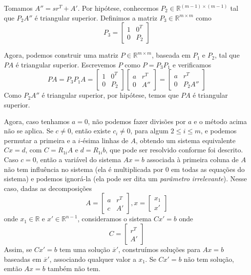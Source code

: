 \documentclass[]{article}
\numberwithin{equation}{section}
\begin{document}
Tomamos $A'' = sr^T + A'$. Por hipótese, conhecemos $P_2 \in \mathbb{R}^{(m - 1) \times (m - 1)}$ tal que $P_2 A''$ é triangular superior. Definimos a matriz $P_3 \in \mathbb{R}^{m \times m}$ como
$$
P_3 =
\begin{bmatrix}
1 & 0^T \\
0 & P_2
\end{bmatrix}
$$

Agora, podemos construir uma matriz $P \in \mathbb{R}^{m \times m}$, baseada em $P_1$ e $P_2$, tal que $PA$ é triangular superior. Escrevemos $P$ como $P = P_3 P_1$ e verificamos
$$
PA = P_3 P_1 A =
\begin{bmatrix}
1 & 0^T \\
0 & P_2
\end{bmatrix}
\begin{bmatrix}
a & r^T \\
0 & A''
\end{bmatrix}
=
\begin{bmatrix}
a & r^T \\
0 & P_2 A''
\end{bmatrix}
$$
Como $P_2 A''$ é triangular superior, por hipótese, temos que $PA$ é triangular superior.

Agora, caso tenhamos $a = 0$, não podemos fazer divisões por $a$ e o método acima não se aplica. Se $c \neq 0$, então existe $c_i \neq 0$, para algum $2 \leq i \leq m$, e podemos permutar a primeira e a $i$-ésima linhas de $A$, obtendo um sistema equivalente $Cx = d$, com $C = R_{1i}A$ e $d = R_{1i} b$, que pode ser resolvido conforme foi descrito. Caso $c = 0$, então a variável do sistema $Ax = b$ associada à primeira coluna de $A$ não tem influência no sistema (ela é multiplicada por 0 em todas as equações do sistema) e podemos ignorá-la (ela pode ser dita um \emph{parâmetro irrelevante}). Nesse caso, dadas as decomposições
$$
A =
\begin{bmatrix}
a & r^T \\
c & A'
\end{bmatrix}
,
x =
\begin{bmatrix}
x_1 \\
x'
\end{bmatrix}
$$
onde $x_1 \in \mathbb{R}$ e $x' \in \mathbb{R}^{n - 1}$, consideramos o sistema $Cx' = b$ onde
$$
C =
\begin{bmatrix}
r^T \\
A'
\end{bmatrix}
$$
Assim, se $Cx' = b$ tem uma solução $\overline{x}'$, construímos soluções para $Ax = b$ baseadas em $\overline{x}'$, associando qualquer valor a $x_1$. Se $Cx' = b$ não tem solução, emtão $Ax = b$ também não tem.
\end{document}

